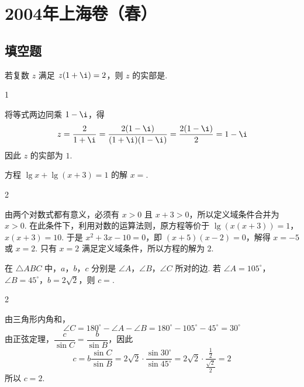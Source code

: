 \chapter{2004年上海卷（春）}
\section{填空题}
\begin{problem}
若复数 \(z\) 满足 \(z(1+\i)=2\)，则 \(z\) 的实部是\fillinblank{}.
\end{problem}

\begin{answer}
1
\end{answer}

\begin{solution}
将等式两边同乘 \(1-\i\)，得
\[
z=\frac{2}{1+\i}=\frac{2(1-\i)}{(1+\i)(1-\i)}=\frac{2(1-\i)}{2}=1-\i
\]
因此 \(z\) 的实部为 \(1\).
\end{solution}

\begin{problem}
方程 \(\lg x+\lg(x+3)=1\) 的解 \(x=\)\fillinblank{}.
\end{problem}

\begin{answer}
2
\end{answer}

\begin{solution}
由两个对数式都有意义，必须有 \(x>0\) 且 \(x+3>0\)，所以定义域条件合并为 \(x>0\). 在此条件下，利用对数的运算法则，原方程等价于
\(\lg\left(x(x+3)\right)=1\)，\(x(x+3)=10\).
于是 \(x^2+3x-10=0\)，即 \((x+5)(x-2)=0\)，解得 \(x=-5\) 或 \(x=2\). 只有 \(x=2\) 满足定义域条件，所以方程的解为 \(2\).
\end{solution}

\begin{problem}
在 \(\triangle ABC\) 中，\(a\)，\(b\)，\(c\) 分别是 \(\angle A\)，\(\angle B\)，\(\angle C\) 所对的边. 若 \(\angle A=105^{\circ}\)，\(\angle B=45^{\circ}\)，\(b=2\sqrt{2}\)，则 \(c=\)\fillinblank{}.
\end{problem}

\begin{answer}
2
\end{answer}

\begin{solution}
由三角形内角和，
\[
\angle C=180^{\circ}-\angle A-\angle B=180^{\circ}-105^{\circ}-45^{\circ}=30^{\circ}
\]
由正弦定理，\(\dfrac{c}{\sin C}=\dfrac{b}{\sin B}\)，因此
\[
c=b\frac{\sin C}{\sin B}=2\sqrt{2}\cdot\frac{\sin30^{\circ}}{\sin45^{\circ}}
=2\sqrt{2}\cdot\frac{\frac{1}{2}}{\frac{\sqrt{2}}{2}}=2
\]
所以 \(c=2\).
\end{solution}

